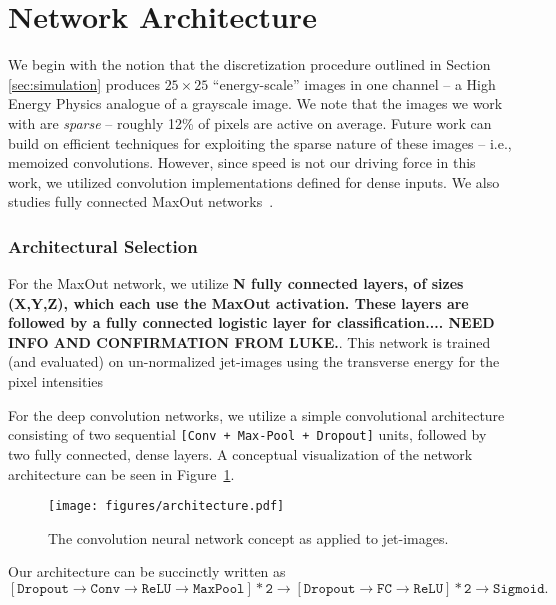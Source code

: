 
\section{Network Architecture}
\label{sec:arch}


We begin with the notion that the discretization procedure outlined in Section \ref{sec:simulation} produces $25\times 25$ ``energy-scale'' images in one channel -- a High Energy Physics analogue of a grayscale image. We note that the images we work with are \emph{sparse} -- roughly 12\% of pixels are active on average. Future work can build on efficient techniques for exploiting the sparse nature of these images -- i.e., memoized convolutions. However, since speed is not our driving force in this work, we utilized convolution implementations defined for dense inputs.  We also studies fully connected MaxOut networks~\cite{maxout:goodfellow}.

\subsubsection{Architectural Selection} %
\label{ssub:architectural_selection}
For the MaxOut network, we utilize \textbf{N fully connected layers, of sizes (X,Y,Z), which each use the MaxOut activation.  These layers are followed by a fully connected logistic layer for classification.... NEED INFO AND CONFIRMATION FROM LUKE.}.  This network is trained (and evaluated) on un-normalized jet-images using the transverse energy for the pixel intensities

For the deep convolution networks, we utilize a simple convolutional architecture consisting of two sequential \texttt{[Conv + Max-Pool + Dropout]} units, followed by two fully connected, dense layers. A conceptual visualization of the network architecture can be seen in Figure~\ref{fig:arch}.
\begin{figure}[!htbp]
  \centering
  \texttt{[image: figures/architecture.pdf]}
  \caption{The convolution neural network concept as applied to jet-images.}
  \label{fig:arch}
\end{figure}

Our architecture can be succinctly written as 
\begin{equation}
  \mathtt{[Dropout \rightarrow Conv \rightarrow ReLU \rightarrow MaxPool] * 2 \rightarrow [Dropout \rightarrow FC \rightarrow ReLU] * 2 \rightarrow Sigmoid}.
\end{equation}

